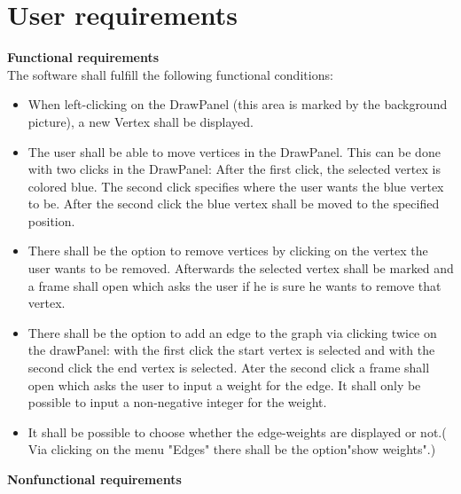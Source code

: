 \documentclass{article}
\begin{document}
\section{User requirements}
\textbf{Functional requirements} \\
The software shall fulfill the following functional conditions:
\begin{itemize}
\item When left-clicking on the DrawPanel (this area is marked by the background picture), a new Vertex shall be displayed.
\item The user shall be able to move vertices in the DrawPanel. This can be done with two clicks in the DrawPanel: After the first click, the selected vertex is colored blue. The second click specifies where the user wants the blue vertex to be. After the second click the blue vertex shall be moved to the specified position.
\item There shall be the option to remove vertices by clicking on the vertex the user wants to be removed. Afterwards the selected vertex shall be marked and a frame shall open which asks the user if he is sure he wants to remove that vertex.
\item There shall be the option to add an edge to the graph via clicking twice on the drawPanel: with the first click the start vertex is selected and with the second click the end vertex is selected. Ater the second click a frame shall open which asks the user to input a weight for the edge. It shall only be possible to input a non-negative integer for the weight.
\item It shall be possible to choose whether the edge-weights are displayed or not.( Via clicking on the menu "Edges" there shall be the option"show weights".) 
\end{itemize}  

\textbf{Nonfunctional requirements} \\
\end{document}
